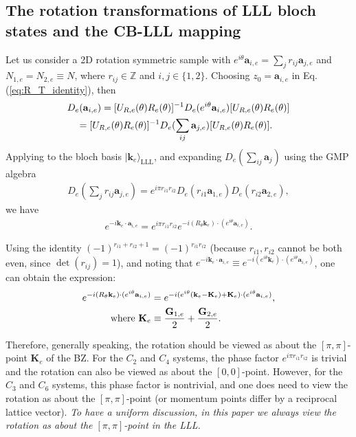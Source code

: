 \begin{subappendices}
    \section{The rotation transformations of LLL bloch states and the CB-LLL mapping}\label{app:mag_rot}
    Let us consider a 2D rotation symmetric sample with $e^{i\theta}\mathbf a_{i,e}= \sum_j r_{ij}\mathbf a_{j,e}$ and $N_{1,e}=N_{2,e}\equiv N$, where $r_{ij}\in\mathbb Z$ and $i,j\in\{1,2\}$. Choosing $z_0=\mathbf a_{i,e}$ in Eq.(\ref{eq:R_T_identity}), then
    \begin{align}
         & D_e(\mathbf a_{i,e})=[U_{R,e}(\theta)R_e(\theta)]^{-1} D_e(e^{i\theta}\mathbf a_{i,e})[U_{R,e}(\theta)R_e(\theta)]\notag \\
         & \quad=[U_{R,e}(\theta)R_e(\theta)]^{-1} D_e(\sum_{ij}\mathbf a_{j,e})[U_{R,e}(\theta)R_e(\theta)].
    \end{align}
    Applying to the bloch basis $|\mathbf k_e\rangle_{\text{LLL}}$, and expanding $D_e(\sum_{ij}\mathbf a_j)$ using the GMP algebra
    \begin{align}
        D_e(\sum_j r_{ij}\mathbf a_{j,e})=e^{i\pi r_{i1}r_{i2}}D_e( r_{i1}\mathbf a_{1,e})D_e( r_{i2}\mathbf a_{2,e}),
    \end{align}
    we have
    \begin{align}
        e^{-i \mathbf k_e\cdot \mathbf a_{i,e}}=e^{i\pi r_{i1}r_{i2}} e^{-i (R_{\theta}\mathbf k_e)\cdot  (e^{i\theta}\mathbf a_{i,e})}.
    \end{align}


    Using the identity $(-1)^{r_{i1}+r_{i2}+1}=(-1)^{r_{i1}r_{i2}}$ (because $r_{i1},r_{i2}$ cannot be both even, since $\det(r_{ij})=1$), and noting that $e^{-i \mathbf k_e\cdot \mathbf a_{i,e}}\equiv e^{-i (e^{i\theta}\mathbf k_e)\cdot (e^{i\theta}\mathbf a_{i,e})}$, one can obtain the expression:
    \begin{align}
        e^{-i (R_{\theta}\mathbf k_e)\cdot  (e^{i\theta}\mathbf a_{i,e})} & =e^{-i (e^{i\theta}(\mathbf k_e-\mathbf K_e)+\mathbf K_e)\cdot (e^{i\theta}\mathbf a_{i,e})},\notag \\
        \text{where }\mathbf K_e                                          & \equiv \frac{\mathbf G_{1,e}}{2}+\frac{\mathbf G_{2,e}}{2}.
    \end{align}

    Therefore, generally speaking, the rotation should be viewed as about the $[\pi,\pi]$-point $\mathbf K_e$ of the BZ. For the $C_2$ and $C_4$ systems, the phase factor $e^{i\pi r_{i1}r_{i2}}$ is trivial and the rotation can also be viewed as about the $[0,0]$-point. However, for the $C_3$ and $C_6$ systems, this phase factor is nontrivial, and one does need to view the rotation as about the $[\pi,\pi]$-point (or momentum points differ by a reciprocal lattice vector). \emph{To have a uniform discussion, in this paper we always view the rotation as about the $[\pi,\pi]$-point in the LLL.}


\end{subappendices}
